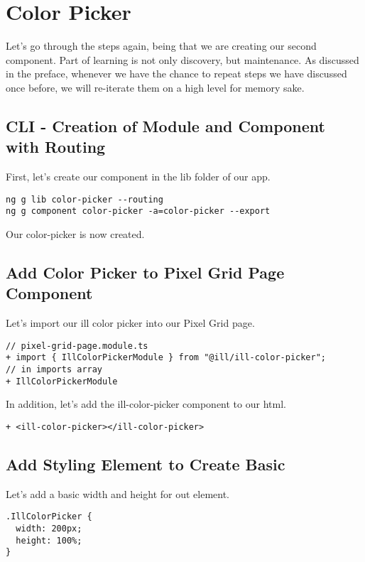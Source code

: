 \maketitle{}
\section{ Color Picker }

Let's go through the steps again, being that we are creating our second
component. Part of learning is not only discovery, but maintenance. As discussed
in the preface, whenever we have the chance to repeat steps we have discussed
once before, we will re-iterate them on a high level for memory sake.

\subsection{ CLI - Creation of Module and Component with Routing }
First, let's create our component in the lib folder of our app.

\begin{lstlisting}
ng g lib color-picker --routing
ng g component color-picker -a=color-picker --export
\end{lstlisting}

Our color-picker is now created.

\subsection{ Add Color Picker to Pixel Grid Page Component }
Let's import our ill color picker into our Pixel Grid page.

\begin{lstlisting}
// pixel-grid-page.module.ts
+ import { IllColorPickerModule } from "@ill/ill-color-picker";
// in imports array
+ IllColorPickerModule
\end{lstlisting}

In addition, let's add the ill-color-picker component to our html.
\begin{lstlisting}
+ <ill-color-picker></ill-color-picker>
\end{lstlisting}

\subsection{ Add Styling Element to Create Basic  }
Let's add a basic width and height for out element.
\begin{lstlisting}
.IllColorPicker {
  width: 200px;
  height: 100%;
}
\end{lstlisting}
